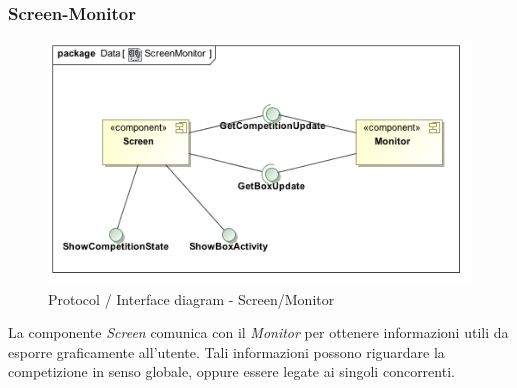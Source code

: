 \subsubsection{Screen-Monitor}
\begin{center}
\begin{figure}[h!]
	\includegraphics[scale=0.55]{img/InteractionDiagram/Implementation_Diagram__ScreenMonitor.jpg}
\caption{Protocol / Interface diagram - Screen/Monitor}
\end{figure}
\end{center}
La componente \emph{Screen} comunica con il \emph{Monitor} per ottenere informazioni utili da esporre graficamente all'utente. Tali
informazioni possono riguardare la competizione in senso globale, oppure essere legate ai singoli concorrenti.
